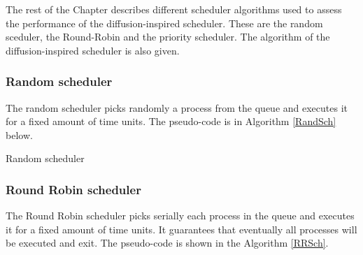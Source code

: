The rest of the Chapter describes different scheduler algorithms used to assess the performance of the diffusion-inspired scheduler. These are the random sceduler, the Round-Robin and the priority scheduler. The algorithm of the diffusion-inspired scheduler is also given.
	
\subsubsection{Random scheduler}
The random scheduler picks randomly a process from the queue and executes it for a fixed amount of time units. The pseudo-code is in Algorithm \ref{RandSch} below.


\begin{algorithm}                      
\caption{Random scheduler}          
\label{RandSch}                           %
\begin{algorithmic}                    
        
        \ENDIF
    
    \ENDWHILE
\end{algorithmic}
\end{algorithm}


	\subsubsection{Round Robin scheduler}
The Round Robin scheduler picks serially each process in the queue and executes it for a fixed amount of time units. It guarantees that eventually all processes will be executed and exit. The pseudo-code is shown in the Algorithm \ref{RRSch}.

